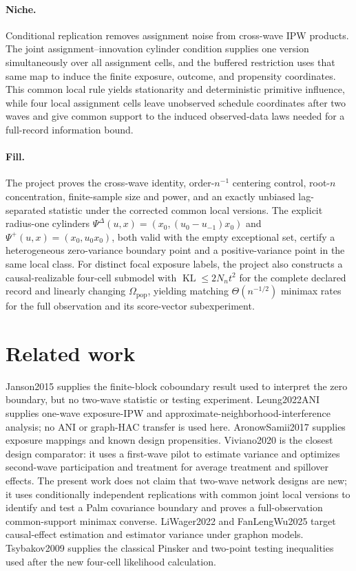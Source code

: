 \documentclass{article}
\begin{document}
\paragraph{Niche.} Conditional replication removes assignment noise from cross-wave IPW products. The joint assignment--innovation cylinder condition supplies one version simultaneously over all assignment cells, and the buffered restriction uses that same map to induce the finite exposure, outcome, and propensity coordinates. This common local rule yields stationarity and deterministic primitive influence, while four local assignment cells leave unobserved schedule coordinates after two waves and give common support to the induced observed-data laws needed for a full-record information bound.

\paragraph{Fill.} The project proves the cross-wave identity, order-\(n^{-1}\) centering control, root-\(n\) concentration, finite-sample size and power, and an exactly unbiased lag-separated statistic under the corrected common local versions. The explicit radius-one cylinders \(\Psi^{\Delta}(u,x)=(x_0,(u_0-u_{-1})x_0)\) and \(\Psi^+(u,x)=(x_0,u_0x_0)\), both valid with the empty exceptional set, certify a heterogeneous zero-variance boundary point and a positive-variance point in the same local class. For distinct focal exposure labels, the project also constructs a causal-realizable four-cell submodel with \(\operatorname{KL}\le2N_nt^2\) for the complete declared record and linearly changing \(\Omega_{\mathrm{pop}}\), yielding matching \(\Theta(n^{-1/2})\) minimax rates for the full observation and its score-vector subexperiment.

\section{Related work}

Janson2015 supplies the finite-block coboundary result used to interpret the zero boundary, but no two-wave statistic or testing experiment. Leung2022ANI supplies one-wave exposure-IPW and approximate-neighborhood-interference analysis; no ANI or graph-HAC transfer is used here. AronowSamii2017 supplies exposure mappings and known design propensities. Viviano2020 is the closest design comparator: it uses a first-wave pilot to estimate variance and optimizes second-wave participation and treatment for average treatment and spillover effects. The present work does not claim that two-wave network designs are new; it uses conditionally independent replications with common joint local versions to identify and test a Palm covariance boundary and proves a full-observation common-support minimax converse. LiWager2022 and FanLengWu2025 target causal-effect estimation and estimator variance under graphon models. Tsybakov2009 supplies the classical Pinsker and two-point testing inequalities used after the new four-cell likelihood calculation.
\end{document}
